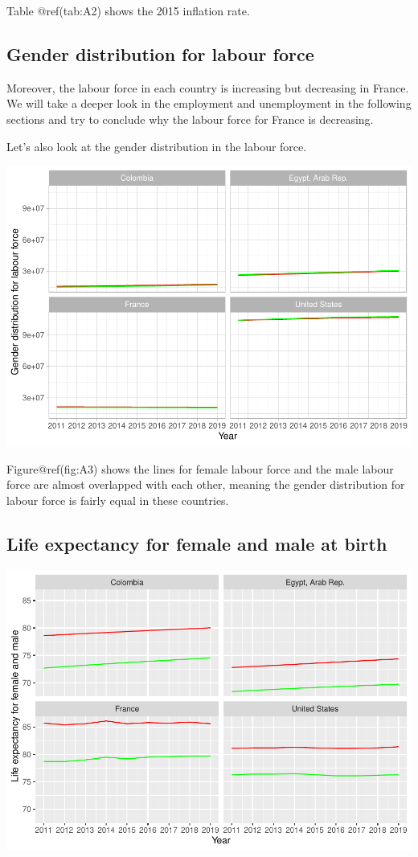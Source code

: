 \documentclass[
]{article}
\begin{document}
Table @ref(tab:A2) shows the 2015 inflation rate.

\hypertarget{gender-distribution-for-labour-force}{%
\subsection{Gender distribution for labour
force}\label{gender-distribution-for-labour-force}}

Moreover, the labour force in each country is increasing but decreasing
in France. We will take a deeper look in the employment and unemployment
in the following sections and try to conclude why the labour force for
France is decreasing.

Let's also look at the gender distribution in the labour force.

\includegraphics{The_Outsiders_5513_files/figure-latex/A3-1.pdf}

Figure@ref(fig:A3) shows the lines for female labour force and the male
labour force are almost overlapped with each other, meaning the gender
distribution for labour force is fairly equal in these countries.

\hypertarget{life-expectancy-for-female-and-male-at-birth}{%
\subsection{Life expectancy for female and male at
birth}\label{life-expectancy-for-female-and-male-at-birth}}

\includegraphics{The_Outsiders_5513_files/figure-latex/A4-1.pdf}
\end{document}

